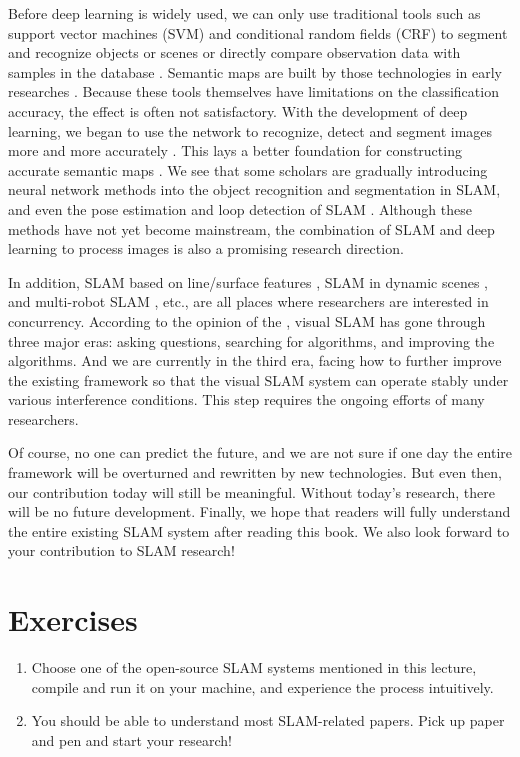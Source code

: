 Before deep learning is widely used, we can only use traditional tools such as support vector machines (SVM) and conditional random fields (CRF) to segment and recognize objects or scenes or directly compare observation data with samples in the database {\cite{Salas- Moreno2013, Salas-Moreno2014}}. Semantic maps are built by those technologies in early researches {\cite{Anand2012, Stueckler2012, Kostavelis2013, Couprie2013}}. Because these tools themselves have limitations on the classification accuracy, the effect is often not satisfactory. With the development of deep learning, we began to use the network to recognize, detect and segment images more and more accurately {\cite{Deng2009, Krizhevsky2012, He2015, Ren2015, Long2014, Zheng2015}}. This lays a better foundation for constructing accurate semantic maps {\cite{Gupta2014}}. We see that some scholars are gradually introducing neural network methods into the object recognition and segmentation in SLAM, and even the pose estimation and loop detection of SLAM {\cite{Konda2015, Kendall2015, Hou2015}}. Although these methods have not yet become mainstream, the combination of SLAM and deep learning to process images is also a promising research direction.

In addition, SLAM based on line/surface features  {\cite{An2012, Zhou2015, Benedettelli2012}} , SLAM in dynamic scenes {\cite{Saarinen2013, Maddern2012, Wang2008}}, and multi-robot SLAM {\cite{Zou2013, Gil2010a, Vidal-Calleja2011}}, etc., are all places where researchers are interested in concurrency. According to the opinion of the \cite{Cadena2016}, visual SLAM has gone through three major eras: asking questions, searching for algorithms, and improving the algorithms. And we are currently in the third era, facing how to further improve the existing framework so that the visual SLAM system can operate stably under various interference conditions. This step requires the ongoing efforts of many researchers.

Of course, no one can predict the future, and we are not sure if one day the entire framework will be overturned and rewritten by new technologies. But even then, our contribution today will still be meaningful. Without today's research, there will be no future development. Finally, we hope that readers will fully understand the entire existing SLAM system after reading this book. We also look forward to your contribution to SLAM research!

\section*{Exercises}
\begin{enumerate}
	\item Choose one of the open-source SLAM systems mentioned in this lecture, compile and run it on your machine, and experience the process intuitively.
	\item You should be able to understand most SLAM-related papers. Pick up paper and pen and start your research!
\end{enumerate}
